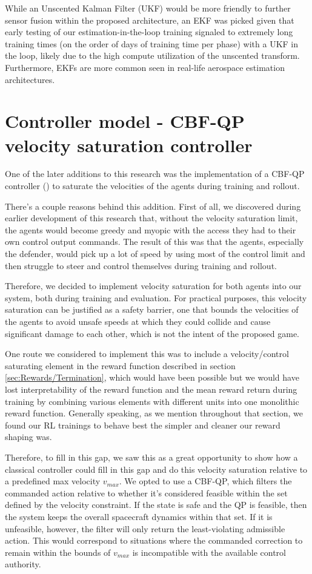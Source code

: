 While an Unscented Kalman Filter (UKF)  would be more friendly to further sensor fusion within the proposed architecture, an EKF was picked given that early testing of our estimation-in-the-loop training signaled to extremely long training times (on the order of days of training time per phase) with a UKF in the loop, likely due to the high compute utilization of the unscented transform. Furthermore, EKFs are more common seen in real-life aerospace estimation architectures.


\section{Controller model - CBF-QP velocity saturation controller}

One of the later additions to this research was the implementation of a CBF-QP controller (\cite{ames2017control}) to saturate the velocities of the agents during training and rollout.

There's a couple reasons behind this addition. First of all, we discovered during earlier development of this research that, without the velocity saturation limit, the agents would become greedy and myopic with the access they had to their own control output commands. The result of this was that the agents, especially the defender, would pick up a lot of speed by using most of the control limit and then struggle to steer and control themselves during training and rollout. 

Therefore, we decided to implement velocity saturation for both agents into our system, both during training and evaluation. For practical purposes, this velocity saturation can be justified as a safety barrier, one that bounds the velocities of the agents to avoid unsafe speeds at which they could collide and cause significant damage to each other, which is not the intent of the proposed game.

One route we considered to implement this was to include a velocity/control saturating element in the reward function described in section \ref{sec:Rewards/Termination}, which would have been possible but we would have lost interpretability of the reward function and the mean reward return during training by combining various elements with different units into one monolithic reward function. Generally speaking, as we mention throughout that section, we found our RL trainings to behave best the simpler and cleaner our reward shaping was.

Therefore, to fill in this gap, we saw this as a great opportunity to show how a classical controller could fill in this gap and do this velocity saturation relative to a predefined max velocity $v_{max}$. We opted to use a CBF-QP, which filters the commanded action relative to whether it's considered feasible within the set defined by the velocity constraint. If the state is safe and the QP is feasible, then the system keeps the overall spacecraft dynamics within that set. If it is unfeasible, however, the filter will only return the least-violating admissible action. This would correspond to situations where the commanded correction to remain within the bounds of $v_{max}$ is incompatible with the available control authority.

